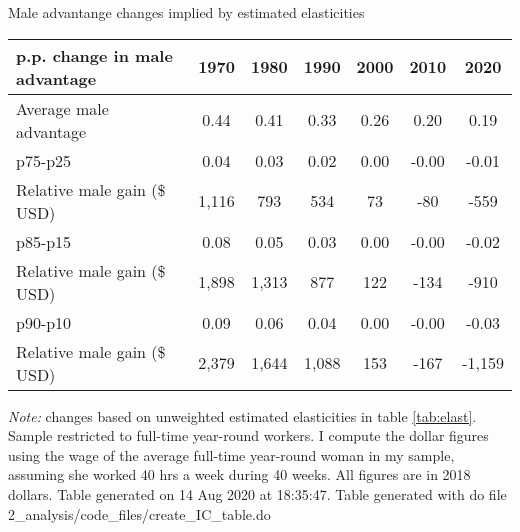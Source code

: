 \begin{center}
\begin{threeparttable}[!h]
\caption{Male advantange changes implied by estimated elasticities}
\label{tab:IC}
\begin{tabular}{lcccccc}
\toprule
\toprule
\textbf{p.p. change in male advantage}&\multicolumn{1}{c}{\textbf{1970}}&\multicolumn{1}{c}{\textbf{1980}}&\multicolumn{1}{c}{\textbf{1990}}&\multicolumn{1}{c}{\textbf{2000}}&\multicolumn{1}{c}{\textbf{2010}}&\multicolumn{1}{c}{\textbf{2020}} \\
\midrule
Average male advantage&        0.44         &        0.41         &        0.33         &        0.26         &        0.20         &        0.19         \\
\midrule p75-p25    &        0.04         &        0.03         &        0.02         &        0.00         &       -0.00         &       -0.01         \\
Relative male gain (\$ USD)&       1,116         &         793         &         534         &          73         &         -80         &        -559         \\
\midrule p85-p15    &        0.08         &        0.05         &        0.03         &        0.00         &       -0.00         &       -0.02         \\
Relative male gain (\$ USD)&       1,898         &       1,313         &         877         &         122         &        -134         &        -910         \\
\midrule p90-p10    &        0.09         &        0.06         &        0.04         &        0.00         &       -0.00         &       -0.03         \\
Relative male gain (\$ USD)&       2,379         &       1,644         &       1,088         &         153         &        -167         &      -1,159         \\
\bottomrule
\bottomrule
\end{tabular}
\begin{tablenotes}
\item \footnotesize \textit{Note:} changes based on unweighted estimated elasticities in table \ref{tab:elast}. Sample restricted to full-time year-round workers. I compute the dollar figures using the wage of the average full-time year-round woman in my sample, assuming she worked 40 hrs a week during 40 weeks. All figures are in 2018 dollars. Table generated on 14 Aug 2020 at 18:35:47. Table generated with do file 2\_analysis/code\_files/create\_IC\_table.do
\end{tablenotes}
\end{threeparttable}
\end{center}
